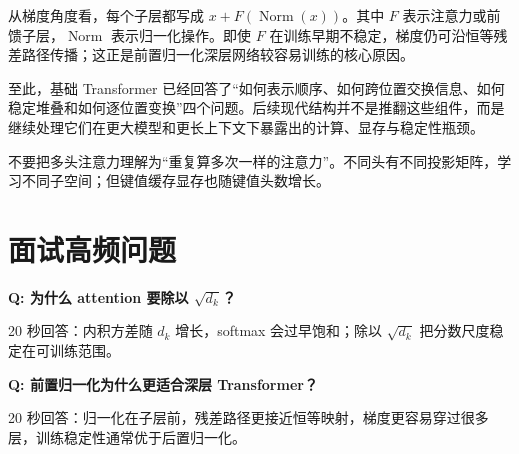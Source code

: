 从梯度角度看，每个子层都写成 $x+F(\operatorname{Norm}(x))$。其中 $F$ 表示注意力或前馈子层，$\operatorname{Norm}$ 表示归一化操作。即使 $F$ 在训练早期不稳定，梯度仍可沿恒等残差路径传播；这正是前置归一化深层网络较容易训练的核心原因。

至此，基础 Transformer 已经回答了“如何表示顺序、如何跨位置交换信息、如何稳定堆叠和如何逐位置变换”四个问题。后续现代结构并不是推翻这些组件，而是继续处理它们在更大模型和更长上下文下暴露出的计算、显存与稳定性瓶颈。

\begin{pitfallbox}
不要把多头注意力理解为“重复算多次一样的注意力”。不同头有不同投影矩阵，学习不同子空间；但键值缓存显存也随键值头数增长。
\end{pitfallbox}

\section*{面试高频问题}

\textbf{Q: 为什么 attention 要除以 $\sqrt{d_k}$？}

20 秒回答：内积方差随 $d_k$ 增长，softmax 会过早饱和；除以 $\sqrt{d_k}$ 把分数尺度稳定在可训练范围。

\textbf{Q: 前置归一化为什么更适合深层 Transformer？}

20 秒回答：归一化在子层前，残差路径更接近恒等映射，梯度更容易穿过很多层，训练稳定性通常优于后置归一化。
